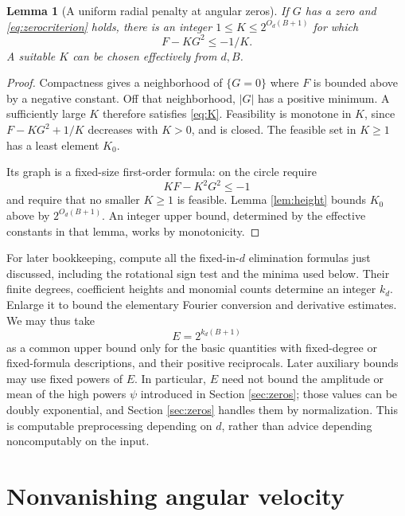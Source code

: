 \documentclass[11pt]{article}
\newtheorem{lemma}[theorem]{Lemma}
\theoremstyle{remark}\newtheorem{remark}[theorem]{Remark}
\newcommand{\se}{2^{O_d(B+1)}}
\begin{document}
\begin{lemma}[A uniform radial penalty at angular zeros]\label{lem:K}
If \(G\) has a zero and \eqref{eq:zerocriterion} holds, there is an integer \(1\leq K\leq\se\) for which
\begin{equation}\label{eq:K}
                   F-KG^2\leq-1/K.
\end{equation}
A suitable \(K\) can be chosen effectively from \(d,B\).
\end{lemma}

\begin{proof}
Compactness gives a neighborhood of \(\{G=0\}\) where \(F\) is bounded above by a negative constant. Off that neighborhood, \(|G|\) has a positive minimum. A sufficiently large \(K\) therefore satisfies \eqref{eq:K}. Feasibility is monotone in \(K\), since \(F-KG^2+1/K\) decreases with \(K>0\), and is closed. The feasible set in \(K\geq1\) has a least element \(K_0\).

Its graph is a fixed-size first-order formula: on the circle require
\[
                         KF-K^2G^2\leq-1
\]
and require that no smaller \(K\geq1\) is feasible. Lemma \ref{lem:height} bounds \(K_0\) above by \(\se\). An integer upper bound, determined by the effective constants in that lemma, works by monotonicity.
\end{proof}

For later bookkeeping, compute all the fixed-in-\(d\) elimination formulas just discussed, including the rotational sign test and the minima used below. Their finite degrees, coefficient heights and monomial counts determine an integer \(k_d\). Enlarge it to bound the elementary Fourier conversion and derivative estimates. We may thus take
\begin{equation}\label{eq:E}
                         E=2^{k_d(B+1)}
\end{equation}
as a common upper bound only for the basic quantities with fixed-degree or fixed-formula descriptions, and their positive reciprocals. Later auxiliary bounds may use fixed powers of \(E\). In particular, \(E\) need not bound the amplitude or mean of the high powers \(\psi\) introduced in Section \ref{sec:zeros}; those values can be doubly exponential, and Section \ref{sec:zeros} handles them by normalization. This is computable preprocessing depending on \(d\), rather than advice depending noncomputably on the input.

\section{Nonvanishing angular velocity}\label{sec:rotate}
\end{document}
